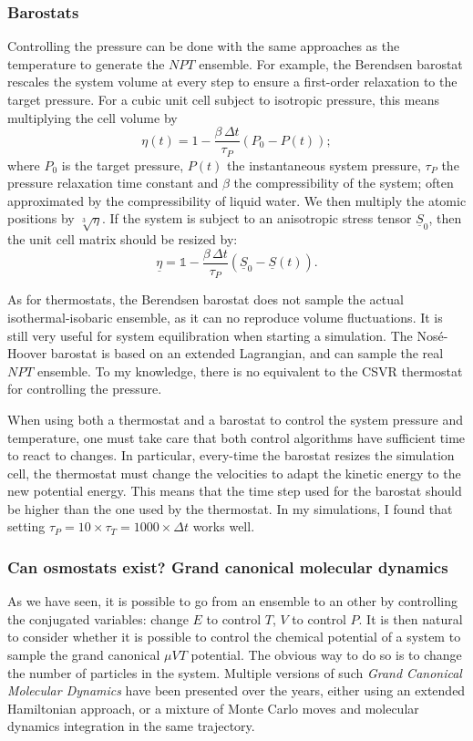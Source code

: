 \documentclass[thesis]{subfiles}
\begin{document}
\subsubsection{Barostats}

Controlling the pressure can be done with the same approaches as the temperature
to generate the $NPT$ ensemble. For example, the Berendsen barostat rescales the
system volume at every step to ensure a first-order relaxation to the target
pressure. For a cubic unit cell subject to isotropic pressure, this means
multiplying the cell volume by
\[ \eta(t) = 1 - \frac{\beta\,\Delta t}{\tau_P} \left(P_0 - P(t)\right);\]
where $P_0$ is the target pressure, $P(t)$ the instantaneous system pressure,
$\tau_P$ the pressure relaxation time constant and $\beta$ the compressibility
of the system; often approximated by the compressibility of liquid water. We
then multiply the atomic positions by $\sqrt[3]{\eta}$. If the system is subject
to an anisotropic stress tensor $\underline{S}_0$, then the unit cell matrix
should be resized by:
\[ \underline{\eta} = \mathds{1} - \frac{\beta\,\Delta t}{\tau_P} \left(\underline{S}_0 - \underline{S}(t)\right). \]

As for thermostats, the Berendsen barostat does not sample the actual
isothermal-isobaric ensemble, as it can no reproduce volume fluctuations. It is
still very useful for system equilibration when starting a simulation. The
Nosé-Hoover barostat is based on an extended Lagrangian, and can sample the real
$NPT$ ensemble. To my knowledge, there is no equivalent to the CSVR thermostat
for controlling the pressure.

When using both a thermostat and a barostat to control the system pressure and
temperature, one must take care that both control algorithms have sufficient
time to react to changes. In particular, every-time the barostat resizes the
simulation cell, the thermostat must change the velocities to adapt the kinetic
energy to the new potential energy. This means that the time step used for the
barostat should be higher than the one used by the thermostat. In my
simulations, I found that setting $\tau_P = 10 \times \tau_T = 1000 \times \Delta
t$ works well.

\subsubsection{Can osmostats exist? Grand canonical molecular dynamics}

As we have seen, it is possible to go from an ensemble to an other by
controlling the conjugated variables: change $E$ to control $T$, $V$ to control
$P$. It is then natural to consider whether it is possible to control the
chemical potential of a system to sample the grand canonical $\mu V T$
potential. The obvious way to do so is to change the number of particles in the
system. Multiple versions of such \emph{Grand Canonical Molecular Dynamics} have
been presented over the years, either using an extended Hamiltonian
approach\cite{Cagin1991,Lo1995,Eslami2007}, or a mixture of Monte Carlo moves
and molecular dynamics integration in the same
trajectory\cite{Heffelfinger1994,Cracknell1995,Boinepalli2003}.
\end{document}
